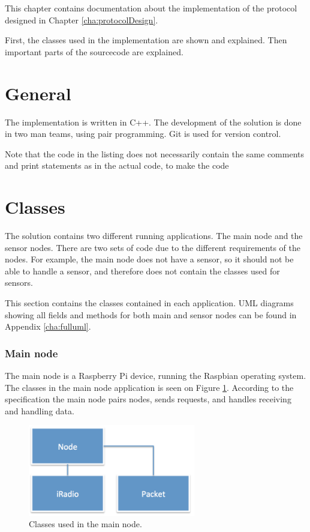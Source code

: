 This chapter contains documentation about the implementation of the protocol designed in Chapter \ref{cha:protocolDesign}. 

First, the classes used in the implementation are shown and explained. Then important parts of the sourcecode are explained.
 

\section{General}
The implementation is written in C++. The development of the solution is done in two man teams, using pair programming. Git is used for version control.

Note that the code in the listing does not necessarily contain the same comments and print statements as in the actual code, to make the code 

\section{Classes}
The solution contains two different running applications. The main node and the sensor nodes. There are two sets of code due to the different requirements of the nodes. For example, the main node does not have a sensor, so it should not be able to handle a sensor, and therefore does not contain the classes used for sensors.

This section contains the classes contained in each application. UML diagrams showing all fields and methods for both main and sensor nodes can be found in Appendix \ref{cha:fulluml}.

\subsubsection*{Main node}
The main node is a Raspberry Pi device, running the Raspbian operating system. The classes in the main node application is seen on Figure \ref{fig:mainnodeClass}. 
According to the specification the main node pairs nodes, sends requests, and handles receiving and handling data.

\begin{figure}[h!]
\centering
\includegraphics[width=0.65\textwidth]{chapters/implementation/figures/mainnodeClass.png}
\caption{Classes used in the main node.}
\label{fig:mainnodeClass}
\end{figure}



